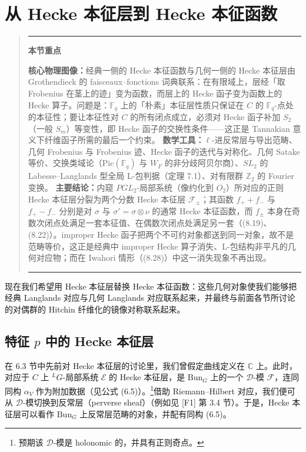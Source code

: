 \documentclass[11pt,a4paper]{article}
\newenvironment{keytakeaway}
  {\par\medskip\begin{quote}\small\noindent
   \rule{\linewidth}{0.6pt}\par\nopagebreak\smallskip\noindent
   \textbf{本节重点}\par\nobreak\smallskip\noindent\ignorespaces}
  {\par\smallskip\noindent\rule{\linewidth}{0.6pt}\end{quote}\medskip}
\newcommand{\Bun}{\mathrm{Bun}}
\newcommand{\CD}{\mathcal{D}}
\begin{document}
\section{从 Hecke 本征层到 Hecke 本征函数}

\begin{keytakeaway}
\textbf{核心物理图像：}经典一侧的 Hecke 本征函数与几何一侧的 Hecke 本征层由 Grothendieck 的 faisceaux--fonctions 词典联系：在有限域上，层经「取 Frobenius 在茎上的迹」变为函数，而层上的 Hecke 函子变为函数上的 Hecke 算子。问题是：$\mathbb{F}_q$ 上的「朴素」本征层性质只保证在 $C$ 的 $\mathbb{F}_q$-点处的本征性；要让本征性对 $C$ 的所有闭点成立，必须对 Hecke 函子补加 $S_2$（一般 $S_m$）等变性，即 Hecke 函子的交换性条件——这正是 Tannakian 意义下纤维函子所需的最后一个约束。
\textbf{数学工具：}$\ell$-进反常层与导出范畴、几何 Frobenius 与 Frobenius 迹、Hecke 函子的迭代与对称化、几何 Satake 等价、交换类域论（$\mathrm{Pic}(\mathbb{F}_q)$ 与 $W_F$ 的非分歧阿贝尔商）、$SL_2$ 的 Labesse--Langlands 型全局 L-包判据（定理 7.1）、对有限群 $\mathbb{Z}_2$ 的 Fourier 变换。
\textbf{主要结论：}内窥 $PGL_2$-局部系统（像约化到 $O_2$）所对应的正则 Hecke 本征层分裂为两个分数 Hecke 本征层 $\mathcal{F}_\pm$；其函数 $f_+ + f_-$ 与 $f_+ - f_-$ 分别是对 $\sigma$ 与 $\sigma' = \sigma\otimes\nu$ 的通常 Hecke 本征函数，而 $f_\pm$ 本身在奇数次闭点处满足一套本征值、在偶数次闭点处满足另一套（(8.19)、(8.22)）。improper Hecke 函子把两个不可约对象都送到同一对象，故不是范畴等价，这正是经典中 improper Hecke 算子消失、L-包结构非平凡的几何对应物；而在 Iwahori 情形（(8.28)）中这一消失现象不再出现。
\end{keytakeaway}

现在我们希望用 Hecke 本征层替换 Hecke 本征函数：这些几何对象使我们能够把经典 Langlands 对应与几何 Langlands 对应联系起来，并最终与前面各节所讨论的对偶群的 Hitchin 纤维化的镜像对称联系起来。

\subsection{特征 \texorpdfstring{$p$}{p} 中的 Hecke 本征层}

在 6.3 节中先前对 Hecke 本征层的讨论里，我们曾假定曲线定义在 $\mathbb{C}$ 上。此时，对应于 $C$ 上 ${}^{L}G$-局部系统 $\mathcal{E}$ 的 Hecke 本征层，是 $\Bun_G$ 上的一个 $\CD$-模 $\mathcal{F}$，连同同构 $\alpha_V$ 作为附加数据（见公式 (6.5)）。\footnote{预期该 $\CD$-模是 holonomic 的，并具有正则奇点。}借助 Riemann--Hilbert 对应，我们便可从 $\CD$-模切换到反常层（perverse sheaf）（例如见 [F1] 第 3.4 节）。于是，Hecke 本征层可以看作 $\Bun_G$ 上反常层范畴的对象，并配有同构 (6.5)。
\end{document}

